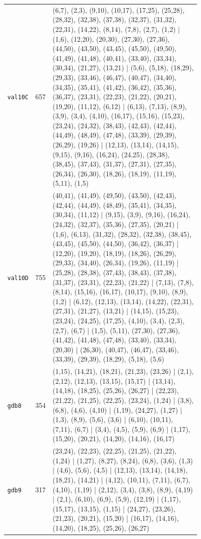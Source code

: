 \begin{landscape}
\begin{longtable}{lr>{\tiny\raggedright\arraybackslash}p{0.78\linewidth}}
\texttt{val10C} & 657 & (6,7), (2,3), (9,10), (10,17), (17,25), (25,28), (28,32), (32,38), (37,38), (32,37), (31,32), (22,31), (14,22), (8,14), (7,8), (2,7), (1,2) | (1,6), (12,20), (20,30), (27,30), (27,36), (44,50), (43,50), (43,45), (45,50), (49,50), (41,49), (41,48), (40,41), (33,40), (33,34), (30,34), (21,27), (13,21) | (5,6), (5,18), (18,29), (29,33), (33,46), (46,47), (40,47), (34,40), (34,35), (35,41), (41,42), (36,42), (35,36), (36,37), (23,31), (22,23), (21,22), (20,21), (19,20), (11,12), (6,12) | (6,13), (7,13), (8,9), (3,9), (3,4), (4,10), (16,17), (15,16), (15,23), (23,24), (24,32), (38,43), (42,43), (42,44), (44,49), (48,49), (47,48), (33,39), (29,39), (26,29), (19,26) | (12,13), (13,14), (14,15), (9,15), (9,16), (16,24), (24,25), (28,38), (38,45), (37,43), (31,37), (27,31), (27,35), (26,34), (26,30), (18,26), (18,19), (11,19), (5,11), (1,5) \\[2pt]
\texttt{val10D} & 755 & (40,41), (41,49), (49,50), (43,50), (42,43), (42,44), (44,49), (48,49), (35,41), (34,35), (30,34), (11,12) | (9,15), (3,9), (9,16), (16,24), (24,32), (32,37), (35,36), (27,35), (20,21) | (1,6), (6,13), (31,32), (28,32), (32,38), (38,45), (43,45), (45,50), (44,50), (36,42), (36,37) | (12,20), (19,20), (18,19), (18,26), (26,29), (29,33), (34,40), (26,34), (19,26), (11,19) | (25,28), (28,38), (37,43), (38,43), (37,38), (31,37), (23,31), (22,23), (21,22) | (7,13), (7,8), (8,14), (15,16), (16,17), (10,17), (9,10), (8,9), (1,2) | (6,12), (12,13), (13,14), (14,22), (22,31), (27,31), (21,27), (13,21) | (14,15), (15,23), (23,24), (24,25), (17,25), (4,10), (3,4), (2,3), (2,7), (6,7) | (1,5), (5,11), (27,30), (27,36), (41,42), (41,48), (47,48), (33,40), (33,34), (20,30) | (26,30), (40,47), (46,47), (33,46), (33,39), (29,39), (18,29), (5,18), (5,6) \\[2pt]
\texttt{gdb8} & 354 & (1,15), (14,21), (18,21), (21,23), (23,26) | (2,1), (2,12), (12,13), (13,15), (15,17) | (13,14), (14,18), (18,25), (25,26), (26,27) | (22,23), (21,22), (21,25), (22,25), (23,24), (1,24) | (3,8), (6,8), (4,6), (4,10) | (1,19), (24,27), (1,27) | (1,3), (8,9), (5,6), (3,6) | (6,10), (10,11), (7,11), (6,7) | (3,4), (4,5), (5,9), (6,9) | (1,17), (15,20), (20,21), (14,20), (14,16), (16,17) \\[2pt]
\texttt{gdb9} & 317 & (23,24), (22,23), (22,25), (21,25), (21,22), (1,24) | (1,27), (8,27), (8,24), (6,8), (3,6), (1,3) | (4,6), (5,6), (4,5) | (12,13), (13,14), (14,18), (18,21), (14,21) | (4,12), (10,11), (7,11), (6,7), (4,10), (1,19) | (2,12), (3,4), (3,8), (8,9), (4,19) | (2,1), (6,10), (6,9), (5,9), (12,19) | (1,17), (15,17), (13,15), (1,15) | (24,27), (23,26), (21,23), (20,21), (15,20) | (16,17), (14,16), (14,20), (18,25), (25,26), (26,27) \\[2pt]

\end{longtable}
\end{landscape}
